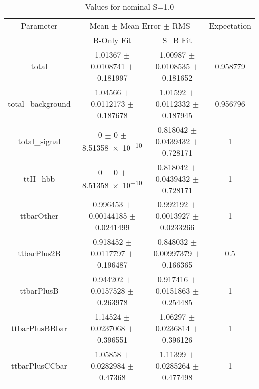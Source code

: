 \begin{table}
\centering
\caption{Values for nominal S=1.0}
\begin{tabular}{cccc}
\toprule
Parameter & \multicolumn{2}{c}{Mean $\pm$ Mean Error $\pm$ RMS} & Expectation\\
 & B-Only Fit & S+B Fit & \\
\midrule
total & \num{1.01367} $\pm$ \num{0.0108741} $\pm$ \num{0.181997} & \num{1.00987} $\pm$ \num{0.0108535} $\pm$ \num{0.181652} & \num{0.958779}\\
total\_background & \num{1.04566} $\pm$ \num{0.0112173} $\pm$ \num{0.187678} & \num{1.01592} $\pm$ \num{0.0112332} $\pm$ \num{0.187945} & \num{0.956796}\\
total\_signal & \num{0} $\pm$ \num{0} $\pm$ \num{8.51358e-10} & \num{0.818042} $\pm$ \num{0.0439432} $\pm$ \num{0.728171} & \num{1}\\
ttH\_hbb & \num{0} $\pm$ \num{0} $\pm$ \num{8.51358e-10} & \num{0.818042} $\pm$ \num{0.0439432} $\pm$ \num{0.728171} & \num{1}\\
ttbarOther & \num{0.996453} $\pm$ \num{0.00144185} $\pm$ \num{0.0241499} & \num{0.992192} $\pm$ \num{0.0013927} $\pm$ \num{0.0233266} & \num{1}\\
ttbarPlus2B & \num{0.918452} $\pm$ \num{0.0117797} $\pm$ \num{0.196487} & \num{0.848032} $\pm$ \num{0.00997379} $\pm$ \num{0.166365} & \num{0.5}\\
ttbarPlusB & \num{0.944202} $\pm$ \num{0.0157528} $\pm$ \num{0.263978} & \num{0.917416} $\pm$ \num{0.0151863} $\pm$ \num{0.254485} & \num{1}\\
ttbarPlusBBbar & \num{1.14524} $\pm$ \num{0.0237068} $\pm$ \num{0.396551} & \num{1.06297} $\pm$ \num{0.0236814} $\pm$ \num{0.396126} & \num{1}\\
ttbarPlusCCbar & \num{1.05858} $\pm$ \num{0.0282984} $\pm$ \num{0.47368} & \num{1.11399} $\pm$ \num{0.0285264} $\pm$ \num{0.477498} & \num{1}\\
\bottomrule
\end{tabular}
\end{table}